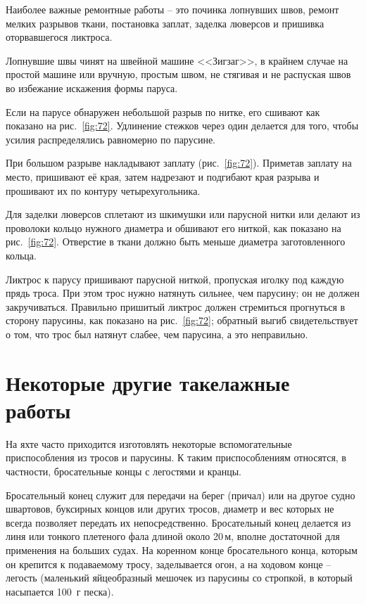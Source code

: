 \documentclass[a4paper, 12pt, twoside, final]{scrbook}
\begin{document}
Наиболее важные ремонтные работы \--- это починка лопнувших швов, ремонт мелких разрывов ткани, постановка заплат, заделка люверсов и пришивка оторвавшегося ликтроса.

Лопнувшие швы чинят на швейной машине <<Зигзаг>>, в крайнем случае на простой машине или вручную, простым швом, не стягивая и не распуская швов во избежание искажения формы паруса.

Если на парусе обнаружен небольшой разрыв по нитке, его сшивают как показано на рис.~\ref{fig:72}. Удлинение стежков через один делается для того, чтобы усилия распределялись равномерно по парусине.

При большом разрыве накладывают заплату (рис.~\ref{fig:72}). Приметав заплату на место, пришивают её края, затем надрезают и подгибают края разрыва и прошивают их по контуру четырехугольника.

Для заделки люверсов сплетают из шкимушки или парусной нитки или делают из проволоки кольцо нужного диаметра и обшивают его ниткой, как показано на рис.~\ref{fig:72}. Отверстие в ткани должно быть меньше диаметра заготовленного кольца.

Ликтрос к парусу пришивают парусной ниткой, пропуская иголку под каждую прядь троса. При этом трос нужно натянуть сильнее, чем парусину; он не должен закручиваться. Правильно пришитый ликтрос должен стремиться прогнуться в сторону парусины, как показано на рис.~\ref{fig:72}; обратный выгиб свидетельствует о том, что трос был натянут слабее, чем парусина, а это неправильно.

\section{Некоторые другие такелажные работы}

На яхте часто приходится изготовлять некоторые вспомогательные приспособления из тросов и парусины. К таким приспособлениям относятся, в частности, бросательные концы с легостями и кранцы.

Бросательный конец служит для передачи на берег (причал) или на другое судно швартовов, буксирных концов или других тросов, диаметр и вес которых не всегда позволяет передать их непосредственно. Бросательный конец делается из линя или тонкого плетеного фала длиной около 20\,м, вполне достаточной для применения на больших судах. На коренном конце бросательного конца, которым он крепится к подаваемому тросу, заделывается огон, а на ходовом конце \--- легость (маленький яйцеобразный мешочек из парусины со стропкой, в который насыпается 100~г песка).
\end{document}
